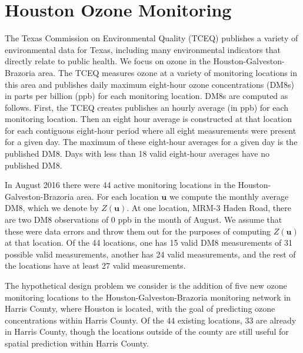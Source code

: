 \documentclass[12pt]{article}
\begin{document}
\section{Houston Ozone Monitoring}
The Texas Commission on Environmental Quality (TCEQ) publishes a variety of environmental data for Texas, including many environmental indicators that directly relate to public health. We focus on ozone in the Houston-Galveston-Brazoria area. The TCEQ measures ozone at a variety of monitoring locations in this area and publishes daily maximum eight-hour ozone concentrations (DM8s) in parts per billion (ppb) for each monitoring location. DM8s are computed as follows. First, the TCEQ creates publishes an hourly average (in ppb) for each monitoring location. Then an eight hour average is constructed at that location for each contiguous eight-hour period where all eight measurements were present for a given day. The maximum of these eight-hour averages for a given day is the published DM8. Days with less than 18 valid eight-hour averages have no published DM8.

In August 2016 there were 44 active monitoring locations in the Houston-Galveston-Brazoria area. For each location $\bm{u}$ we compute the monthly average DM8, which we denote by $Z(\bm{u})$. At one location, MRM-3 Haden Road, there are two DM8 observations of 0 ppb in the month of August. We assume that these were data errors and throw them out for the purposes of computing $Z(\bm{u})$ at that location. Of the 44 locations, one has 15 valid DM8 measurements of 31 possible valid measurements, another has 24 valid measurements, and the rest of the locations have at least 27 valid measurements. 

The hypothetical design problem we consider is the addition of five new ozone monitoring locations to the Houston-Galveston-Brazoria monitoring network in Harris County, where Houston is located, with the goal of predicting ozone concentrations within Harris County. Of the 44 existing locations, 33 are already in Harris County, though the locations outside of the county are still useful for spatial prediction within Harris County. 
\end{document}
